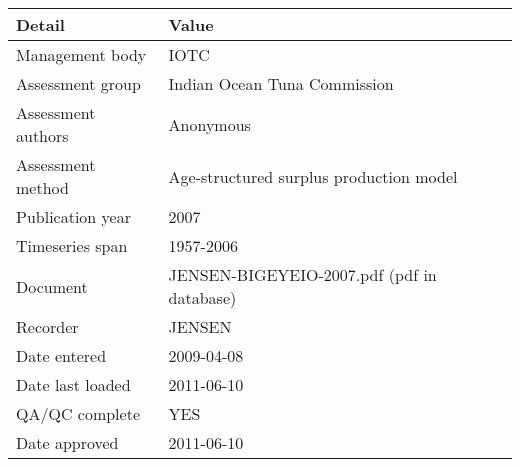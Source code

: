 \begin{table}[htb]
\centering
\begin{tabular}{ll}
\toprule
Detail & Value \\
\midrule
Management body    & IOTC                                       \\
Assessment group   & Indian Ocean Tuna Commission               \\
Assessment authors & Anonymous                                  \\
Assessment method  & Age-structured surplus production model    \\
Publication year   & 2007                                       \\
Timeseries span    & 1957-2006                                  \\
Document           & JENSEN-BIGEYEIO-2007.pdf (pdf in database) \\
Recorder           & JENSEN                                     \\
Date entered       & 2009-04-08                                 \\
Date last loaded   & 2011-06-10                                 \\
QA/QC complete     & YES                                        \\
Date approved      & 2011-06-10                                 \\
\bottomrule
\end{tabular}
\label{tab:assessdet}
\end{table}
